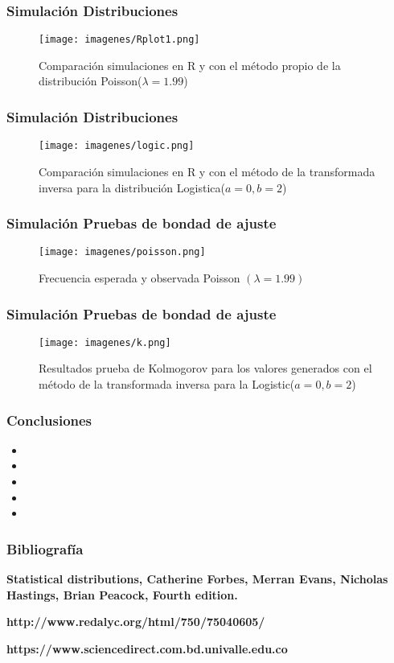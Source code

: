 \documentclass[12pt]{beamer}
\begin{document}
\begin{frame}
\frametitle{Simulación Distribuciones }
\begin{figure}
\centering
\texttt{[image: imagenes/Rplot1.png]}
\caption{Comparación simulaciones en R y con el método propio de la distribución Poisson($\lambda=1.99$)}\label{figura2}
\end{figure}
\end{frame}

\begin{frame}
\frametitle{Simulación Distribuciones}
\begin{figure}
\centering
\texttt{[image: imagenes/logic.png]}
\caption{Comparación simulaciones en R y con el método de la transformada inversa para la distribución Logistica($a=0,b=2$)}\label{figura2}
\end{figure}
\end{frame}

\begin{frame}
\frametitle{Simulación Pruebas de bondad de ajuste}
\begin{figure}
\centering
\texttt{[image: imagenes/poisson.png]}
\caption{Frecuencia esperada y observada Poisson $(\lambda=1.99)$}\label{figura2}
\end{figure}
\end{frame}


\begin{frame}
\frametitle{Simulación Pruebas de bondad de ajuste}
\begin{figure}
  \centering
  \texttt{[image: imagenes/k.png]}
  \caption{Resultados prueba de Kolmogorov para los valores generados con el método de la transformada inversa para la Logistic($a=0,b=2$)}\label{figura1}
\end{figure}
\end{frame}


\begin{frame}
\frametitle{Conclusiones}
\begin{itemize}
\item{}
\item{}
\item{}
\item{}
\item{}
\end{itemize}
\end{frame}

\begin{frame}
\frametitle{Bibliografía}
\begin{block}{\textbf {Statistical distributions, Catherine Forbes, Merran Evans, Nicholas Hastings, Brian Peacock, Fourth edition.}}
\end{block}	
\begin{block}{\textbf {http://www.redalyc.org/html/750/75040605/}}
\end{block}
\begin{block}{\textbf {https://www.sciencedirect.com.bd.univalle.edu.co}}
\end{block}
\end{frame}
\end{document}
